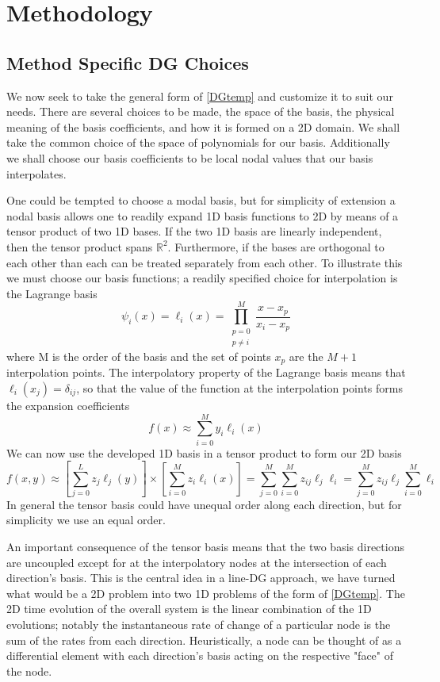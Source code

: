 \documentclass[letterpaper,12pt]{report}
\newcommand{\be}{\begin{equation}}
\newcommand{\ee}{\end{equation}}
\begin{document}
\chapter{Methodology}
\section{Method Specific DG Choices}
We now seek to take the general form of \eqref{DGtemp} and customize it to suit our needs. There are several choices to be made, the space of the basis, the physical meaning of the basis coefficients, and how it is formed on a 2D domain. We shall take the common choice of the space of polynomials for our basis. Additionally we shall choose our basis coefficients to be local nodal values that our basis interpolates.

One could be tempted to choose a modal basis, but for simplicity of extension a nodal basis allows one to readily expand 1D basis functions to 2D by means of a tensor product of two 1D bases. If the two 1D basis are linearly independent, then the tensor product spans $\mathbb{R}^2$. Furthermore, if the bases are orthogonal to each other than each can be treated separately from each other. To illustrate this we must choose our basis functions; a readily specified choice for interpolation is the Lagrange basis
\be \psi_i(x) =\ell_i(x) = \prod_{\substack{p=0\\ p\neq i}}^M \frac{x-x_p}{x_i-x_p}\ee
where M is the order of the basis and the set of points ${x_p}$ are the $M+1$ interpolation points. The interpolatory property of the Lagrange basis means that $\ell_i(x_j) = \delta_{ij}$, so that the value of the function at the interpolation points forms the expansion coefficients
\be f(x) \approx \sum_{i=0}^M y_i \ell_i(x) \ee
We can now use the developed 1D basis in a tensor product to form our 2D basis
\be f(x,y) \approx \left[\sum_{j=0}^L z_j \ell_j(y) \right] \times \left[ \sum_{i=0}^M z_i \ell_i(x) \right] = \sum_{j=0}^M \sum_{i=0}^M z_{ij} \ell_j \ell_i =  \sum_{j=0}^M z_{ij} \ell_j \sum_{i=0}^M  \ell_i \ee
In general the tensor basis could have unequal order along each direction, but for simplicity we use an equal order.

An important consequence of the tensor basis means that the two basis directions are uncoupled except for at the interpolatory nodes at the intersection of each direction's basis. This is the central idea in a line-DG approach, we have turned what would be a 2D problem into two 1D problems of the form of \eqref{DGtemp}. The 2D time evolution of the overall system is the linear combination of the 1D evolutions; notably the instantaneous rate of change of a particular node is the sum of the rates from each direction. Heuristically, a node can be thought of as a differential element with each direction's basis acting on the respective "face" of the node.
\end{document}
